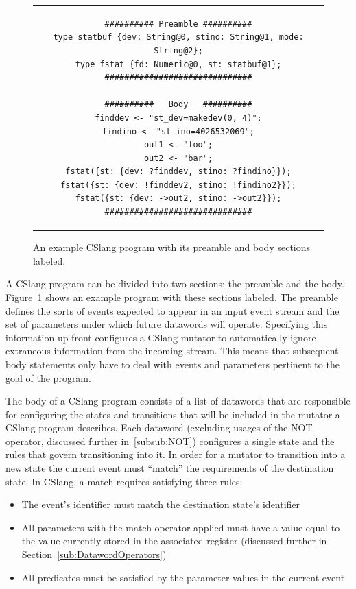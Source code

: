 \begin{figure}[h]
\centering
\begin{tabular}{c}
\begin{lstlisting}
########## Preamble ##########
type statbuf {dev: String@0, stino: String@1, mode: String@2};
type fstat {fd: Numeric@0, st: statbuf@1};
##############################

##########   Body   ##########
finddev <- "st_dev=makedev(0, 4)";
findino <- "st_ino=4026532069";
out1 <- "foo";
out2 <- "bar";
fstat({st: {dev: ?finddev, stino: ?findino}});
fstat({st: {dev: !finddev2, stino: !findino2}});
fstat({st: {dev: ->out2, stino: ->out2}});
##############################
\end{lstlisting}
\end{tabular}
\caption{An example CSlang program with its preamble and body sections
  labeled.}
\label{lst:PreambleBody}
\end{figure}



A CSlang program can be divided into two sections: the preamble and the body.
Figure~\ref{lst:PreambleBody} shows an example program with these sections
labeled.
The preamble defines the sorts of events
expected
to appear in an input event stream and the set of parameters
under which future datawords will operate.  Specifying this information
up-front configures a CSlang mutator to
automatically ignore extraneous information from the incoming stream.  This
means that subsequent body statements only have to deal with events and
parameters pertinent to the goal of the program.

The body of a CSlang program consists of a list of datawords that
are responsible for configuring the states and transitions
that will be included in the mutator a CSlang program describes.
Each dataword (excluding usages of the NOT operator, discussed further
in~\ref{subsub:NOT}) configures a single
state and the rules that govern transitioning into it.
In order for a mutator to transition into a new state
the current event must ``match'' the requirements of the destination state.
In CSlang, a match requires satisfying three rules:

\begin{itemize}
\item{The event's identifier must match the destination state's identifier}
\item{All parameters with the match operator applied must have a value equal to
  the value currently stored in the associated register (discussed further
    in Section~\ref{sub:DatawordOperators})}
\item{All predicates must be satisfied by the parameter values in the
  current event}
\end{itemize}




